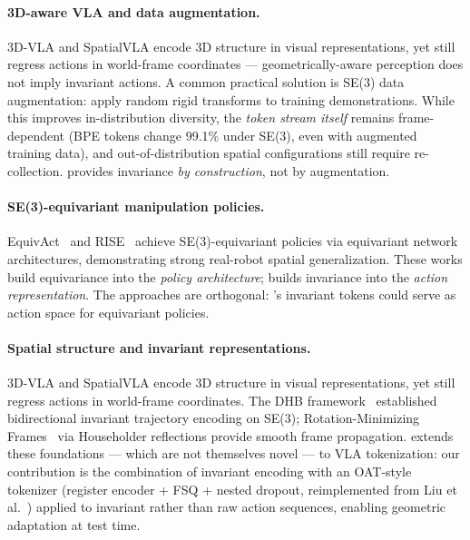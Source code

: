 \paragraph{3D-aware VLA and data augmentation.}
3D-VLA and SpatialVLA encode 3D structure in visual representations, yet
still regress actions in world-frame coordinates --- geometrically-aware
perception does not imply invariant actions.
A common practical solution is SE(3) data augmentation: apply random rigid
transforms to training demonstrations. While this improves in-distribution
diversity, the \emph{token stream itself} remains frame-dependent (BPE tokens
change 99.1\% under SE(3), even with augmented training data), and
out-of-distribution spatial configurations still require re-collection.
\dhb{} provides invariance \emph{by construction}, not by augmentation.

\paragraph{SE(3)-equivariant manipulation policies.}
EquivAct~\cite{equivact2024} and RISE~\cite{rise2024} achieve SE(3)-equivariant
policies via equivariant network architectures, demonstrating strong
real-robot spatial generalization.
These works build equivariance into the \emph{policy architecture};
\dhb{} builds invariance into the \emph{action representation}.
The approaches are orthogonal: \dhb{}'s invariant tokens could serve as
action space for equivariant policies.

\paragraph{Spatial structure and invariant representations.}
3D-VLA and SpatialVLA encode 3D structure in visual representations, yet
still regress actions in world-frame coordinates.
The DHB framework~\cite{soloperto2015,lee2018} established bidirectional
invariant trajectory encoding on SE(3); Rotation-Minimizing Frames~\cite{wang2008rmf}
via Householder reflections provide smooth frame propagation.
\dhb{} extends these foundations — which are not themselves novel — to VLA
tokenization: our contribution is the combination of invariant encoding
with an OAT-style tokenizer (register encoder + FSQ + nested dropout,
reimplemented from Liu et al.~\cite{oat2026}) applied to invariant rather
than raw action sequences, enabling geometric adaptation at test time.
